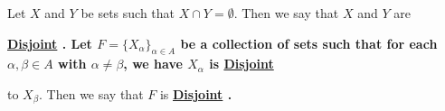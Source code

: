 \newcommand{\Disjoint}[0]{
    \bf \hyperref[def:Disjoint]{Disjoint} \rm
}
\newcommand{\Disjointedness}[0]{
    \bf \hyperref[def:Disjoint]{Disjointedness} \rm
}\begin{df}[Disjoint]
\label{def:Disjoint}

\rm
    Let $X$ and $Y$ be sets such that 
    $X \cap Y = \emptyset$. 
    Then we say that $X$ and $Y$ are 
    \Disjoint. 
    Let $F=\{X_{\alpha}\}_{\alpha \in A}$ 
	be a collection of sets
    such that for each $\alpha, \beta \in A$ 
    with $\alpha \neq \beta$, we have 
    $X_\alpha$ 
    is \Disjoint
    to 
    $X_{\beta}$. 
    Then we say that $F$ is \Disjoint. 
\end{df}
